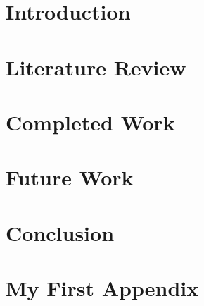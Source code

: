 \documentclass[a4paper,11pt,twoside]{report}
\author{\me}
\begin{document}


\normalsize

%
\begingroup
\singlespacing
\tableofcontents
\endgroup
\linespread{2}
\chapter{Introduction}\label{chapter:Introduction}
\setcounter{page}{0}


\chapter{Literature Review}\label{chapter:Literature Review}


\begingroup
\renewcommand{\cleardoublepage}{}
\renewcommand{\clearpage}{}
\vspace{33pt}
\chapter{Completed Work}\label{chapter:Completed Work}
\endgroup


\chapter{Future Work}\label{chapter:Future Work}


\chapter{Conclusion}\label{chapter:Conclusion}




\newpage

\appendix
\chapter{My First Appendix}\label{chapter:Appendix A}

\end{document}

